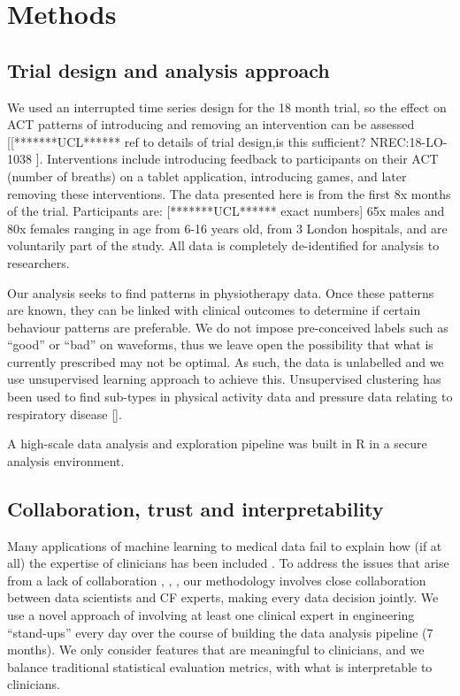 \documentclass{article}
\begin{document}
\section{Methods}
\subsection{Trial design and analysis approach}
We used an interrupted time series design for the 18 month trial, so the effect on ACT patterns of introducing and removing an intervention can be assessed [[*******UCL****** ref to details of trial design,is this sufficient? NREC:18-LO-1038 ]. Interventions include introducing feedback to participants on their ACT (number of breaths) on a tablet application, introducing games, and later removing these interventions. The data presented here is from the first 8x months of the trial. Participants are: [*******UCL****** exact numbers] 65x males and 80x females ranging in age from 6-16 years old, from 3 London hospitals, and are voluntarily part of the study. All data is completely de-identified for analysis to researchers. 
 
Our analysis seeks to find patterns in physiotherapy data. Once these patterns are known, they can be linked with clinical outcomes to determine if certain behaviour patterns are preferable. We do not impose pre-conceived labels such as “good” or “bad” on waveforms, thus we leave open the possibility that what is currently prescribed may not be optimal. As such, the data is unlabelled and we use unsupervised learning approach to achieve this. Unsupervised clustering has been used to find sub-types in physical activity data \cite{physical_activity_patterns_2017} and pressure data relating to respiratory disease []. 

A high-scale data analysis and exploration pipeline was built in R in a secure analysis environment.  

\subsection{Collaboration, trust and interpretability}
Many applications of machine learning to medical data fail to explain how (if at all) the expertise of clinicians has been included \cite{Alaa2018}. To address the issues that arise from a lack of collaboration \cite{Vayena2018}, \cite{Challen231}, \cite{Char2018}, \cite{Ahmad2018} our methodology involves close collaboration between data scientists and CF experts, making every data decision jointly. We use a novel approach of involving at least one clinical expert in engineering “stand-ups” every day over the course of building the data analysis pipeline (7 months). We only consider features that are meaningful to clinicians, and we balance traditional statistical evaluation metrics, with what is interpretable to clinicians.  
\end{document}
